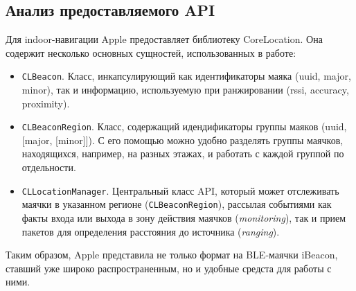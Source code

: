 \subsection{Анализ предоставляемого API}

Для indoor-навигации Apple предоставляет библиотеку CoreLocation. Она содержит несколько основных сущностей, использованных в работе:

\begin{itemize}
    \item
    \texttt{CLBeacon}. Класс, инкапсулирующий как идентификаторы маяка (uuid, major, minor), так и информацию, используемую при ранжировании (rssi, accuracy, proximity).
    \item
    \texttt{CLBeaconRegion}. Класс, содержащий идендификаторы группы маяков (uuid, [major, [minor]]). С его помощью можно удобно разделять группы маячков, находящихся, например, на разных этажах, и работать с каждой группой по отдельности.
    \item
    \texttt{CLLocationManager}. Центральный класс API, который может отслеживать маячки в указанном регионе (\texttt{CLBeaconRegion}), рассылая событиями как факты входа или выхода в зону действия маячков (\textit{monitoring}), так и прием пакетов для определения расстояния до источника (\textit{ranging}).
\end{itemize}

Таким образом, Apple представила не только формат на BLE-маячки iBeacon, ставший уже широко распространенным, но и удобные средста для работы с ними.